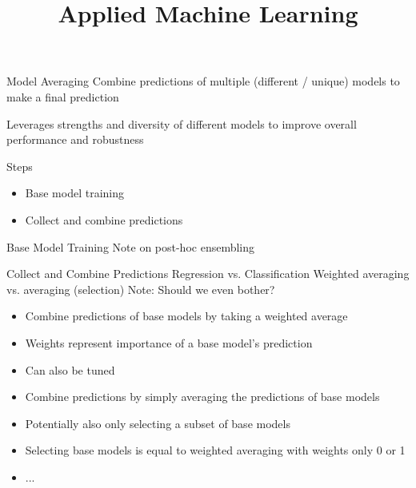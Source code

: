 \documentclass[11pt,compress,t,notes=noshow, aspectratio=169, xcolor=table]{beamer}
\title{Applied Machine Learning}
\date{}
\begin{document}


\begin{vbframe}{Model Averaging}
Combine predictions of multiple (different / unique) models to make a final prediction

Leverages strengths and diversity of different models to improve overall performance and robustness
\end{vbframe}


\begin{vbframe}{Steps}

\begin{itemize}
\item Base model training
\item Collect and combine predictions
\end{itemize}
\end{vbframe}


\begin{vbframe}{Base Model Training}
Note on post-hoc ensembling
\end{vbframe}


\begin{vbframe}{Collect and Combine Predictions}
  Regression vs. Classification
  Weighted averaging vs. averaging (selection) Note: Should we even bother?

  \begin{itemize}
    \item Combine predictions of base models by taking a weighted average
    \item Weights represent importance of a base model's prediction
    \item Can also be tuned
  \end{itemize}

  \begin{itemize}
    \item Combine predictions by simply averaging the predictions of base models
    \item Potentially also only selecting a subset of base models
    \item Selecting base models is equal to weighted averaging with weights only 0 or 1
   \end{itemize}
\end{vbframe}


\begin{vbframe}{}

\begin{itemize}
  \item ...
\end{itemize}

\end{vbframe}



\endlecture
\end{document}
